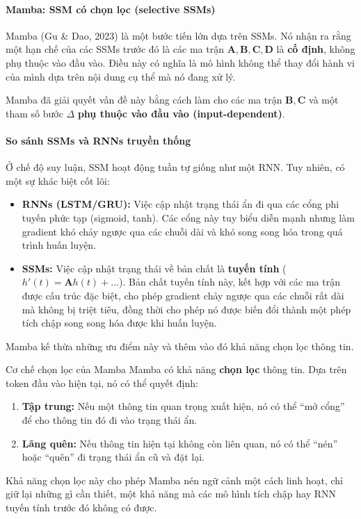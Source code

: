 \paragraph{Mamba: SSM có chọn lọc (selective SSMs)}
Mamba (Gu \& Dao, 2023) \cite{gu2023mamba} là một bước tiến lớn dựa trên SSMs. Nó nhận ra rằng một hạn chế của các SSMs trước đó là các ma trận $\mathbf{A, B, C, D}$ là \textbf{cố định}, không phụ thuộc vào đầu vào. Điều này có nghĩa là mô hình không thể thay đổi hành vi của mình dựa trên nội dung cụ thể mà nó đang xử lý.

Mamba đã giải quyết vấn đề này bằng cách làm cho các ma trận $\mathbf{B, C}$ và một tham số bước $\Delta$ \textbf{phụ thuộc vào đầu vào (input-dependent)}.
\paragraph{So sánh SSMs và RNNs truyền thống}
Ở chế độ suy luận, SSM hoạt động tuần tự giống như một RNN. Tuy nhiên, có một sự khác biệt cốt lõi:
\begin{itemize}
    \item \textbf{RNNs (LSTM/GRU):} Việc cập nhật trạng thái ẩn đi qua các cổng phi tuyến phức tạp (sigmoid, tanh). Các cổng này tuy biểu diễn mạnh nhưng làm gradient khó chảy ngược qua các chuỗi dài và khó song song hóa trong quá trình huấn luyện.
    \item \textbf{SSMs:} Việc cập nhật trạng thái về bản chất là \textbf{tuyến tính} ($h'(t) = \mathbf{A}h(t) + \dots$). Bản chất tuyến tính này, kết hợp với các ma trận được cấu trúc đặc biệt, cho phép gradient chảy ngược qua các chuỗi rất dài mà không bị triệt tiêu, đồng thời cho phép nó được biến đổi thành một phép tích chập song song hóa được khi huấn luyện.
\end{itemize}
Mamba kế thừa những ưu điểm này và thêm vào đó khả năng chọn lọc thông tin.
\begin{assess}{Cơ chế chọn lọc của Mamba}
Mamba có khả năng \textbf{chọn lọc} thông tin. Dựa trên token đầu vào hiện tại, nó có thể quyết định:
\begin{enumerate}
    \item \textbf{Tập trung:} Nếu một thông tin quan trọng xuất hiện, nó có thể “mở cổng” để cho thông tin đó đi vào trạng thái ẩn.
    \item \textbf{Lãng quên:} Nếu thông tin hiện tại không còn liên quan, nó có thể “nén” hoặc “quên” đi trạng thái ẩn cũ và đặt lại.
\end{enumerate}
Khả năng chọn lọc này cho phép Mamba nén ngữ cảnh một cách linh hoạt, chỉ giữ lại những gì cần thiết, một khả năng mà các mô hình tích chập hay RNN tuyến tính trước đó không có được.
\end{assess}

